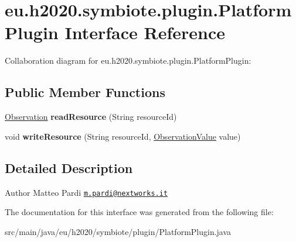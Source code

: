 \hypertarget{interfaceeu_1_1h2020_1_1symbiote_1_1plugin_1_1PlatformPlugin}{}\section{eu.\+h2020.\+symbiote.\+plugin.\+Platform\+Plugin Interface Reference}
\label{interfaceeu_1_1h2020_1_1symbiote_1_1plugin_1_1PlatformPlugin}


Collaboration diagram for eu.\+h2020.\+symbiote.\+plugin.\+Platform\+Plugin\+:
\subsection*{Public Member Functions}
\begin{DoxyCompactItemize}
\item 
\mbox{\label{interfaceeu_1_1h2020_1_1symbiote_1_1plugin_1_1PlatformPlugin_ad5bfcb9644835beeca8849d6ec197c01}} 
\hyperlink{classeu_1_1h2020_1_1symbiote_1_1model_1_1data_1_1Observation}{Observation} {\bfseries read\+Resource} (String resource\+Id)
\item 
\mbox{\label{interfaceeu_1_1h2020_1_1symbiote_1_1plugin_1_1PlatformPlugin_a92e2fbfb5ba607aff7f530ff86f17f44}} 
void {\bfseries write\+Resource} (String resource\+Id, \hyperlink{classeu_1_1h2020_1_1symbiote_1_1model_1_1data_1_1ObservationValue}{Observation\+Value} value)
\end{DoxyCompactItemize}


\subsection{Detailed Description}
\begin{DoxyAuthor}{Author}
Matteo Pardi \href{mailto:m.pardi@nextworks.it}{\tt m.\+pardi@nextworks.\+it} 
\end{DoxyAuthor}


The documentation for this interface was generated from the following file\+:\begin{DoxyCompactItemize}
\item 
src/main/java/eu/h2020/symbiote/plugin/Platform\+Plugin.\+java\end{DoxyCompactItemize}
